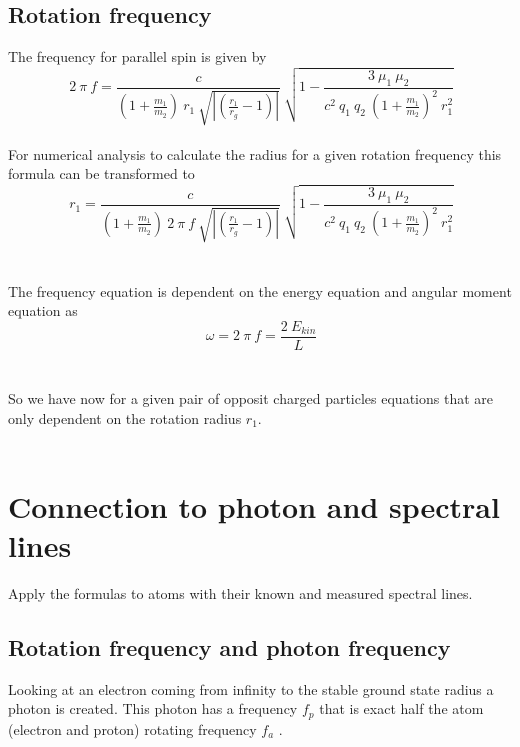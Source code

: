 \documentclass[10pt,titlepage]{article}
\begin{document}

\subsection{Rotation frequency}
The frequency for parallel spin is given by
\begin{equation}
\ 2 \ \pi \ f=\frac{c}{(1+\frac{m_1}{m_2}) \ r_1 \ \sqrt{|(\frac{r_1}{r_g}-1)|}} \ \sqrt{1-\frac{3 \ \mu_1 \ \mu_2}{c^2 \ q_1 \ q_2 \ (1+\frac{m_1}{m_2})^2 \ r_1^2}}
\end{equation}
\\
For numerical analysis to calculate the radius for a given rotation frequency this formula can be transformed to
\begin{equation}
\label{eqraf}
\ r_1=\frac{c}{(1+\frac{m_1}{m_2}) \ 2 \ \pi \ f \ \sqrt{|(\frac{r_1}{r_g}-1)|}} \ \sqrt{1-\frac{3 \ \mu_1 \ \mu_2}{c^2 \ q_1 \ q_2 \ (1+\frac{m_1}{m_2})^2 \ r_1^2}}
\end{equation}
\\\\
The frequency equation is dependent on the energy equation and angular moment equation as
\\
\begin{equation}
\ \omega=2 \ \pi \ f=\frac{2 \ E_{kin}}{L}
\end{equation}
\\
\\
So we have now for a given pair of opposit charged particles equations that are only dependent on the rotation radius $r_1$.
\\\\


\section{Connection to photon and spectral lines}
Apply the formulas to atoms with their known and measured spectral lines.\\


\subsection{Rotation frequency and photon frequency}
Looking at an electron coming from infinity to the stable ground state radius a photon is created.
This photon has a frequency $f_p$ that is exact half the atom (electron and proton) rotating frequency $f_a$ .\\
\end{document}
